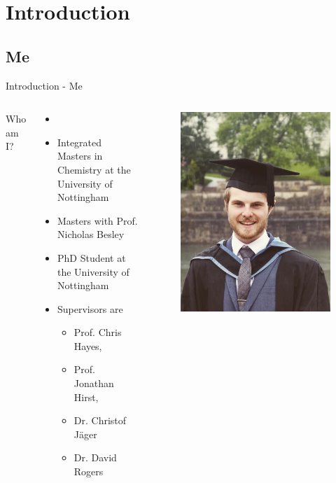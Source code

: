 \section{Introduction}
\subsection{Me}
\begin{frame}{Introduction - Me}
\begin{columns}
Who am I?
\begin{itemize}
\item \insertauthor
\item Integrated Masters in Chemistry at the University of Nottingham
\item Masters with Prof. Nicholas Besley
\item PhD Student at the University of Nottingham
\item Supervisors are 
	\begin{itemize}
		\item Prof. Chris Hayes,
		\item Prof. Jonathan Hirst,
		\item Dr. Christof J\"{a}ger
		\item Dr. David Rogers
	\end{itemize}
\end{itemize}
\begin{figure}
\includegraphics[height=0.8\textheight]{figures/Me/Graduation_Headshot.jpg}
\end{figure}


\end{columns}
\end{frame}
